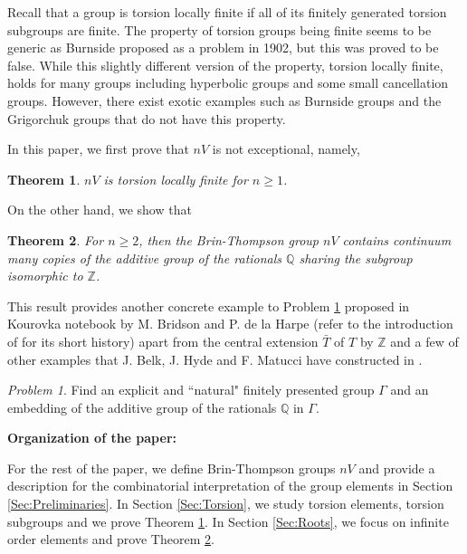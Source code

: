 \documentclass[12pt,reqno]{amsart}
\theoremstyle{plain}
\newtheorem{theorem}{Theorem}[section]
\theoremstyle{definition}
\theoremstyle{remark}
\newtheorem{problem}[remark]{Problem}
\numberwithin{equation}{section}
\begin{document}
Recall that a group is torsion locally finite if  
all of its finitely generated torsion subgroups are finite.  
%
The property of torsion groups being finite seems to be generic 
as Burnside proposed as a problem in 1902, 
but this was proved to be false. 
While this slightly different version of the property, torsion locally finite, 
holds for many groups including hyperbolic groups and 
some small cancellation groups.  
However, there exist exotic examples such as Burnside groups 
and the Grigorchuk groups  \cite{Grigorchuk}  
that do not have this property.

In this paper, 
we first prove that  $nV$  is not exceptional,
namely, 
 
\begin{theorem}\label{Thm:Main1} 
	$nV$  is torsion locally finite for  $n \geq 1$.  
\end{theorem} 

On the other hand,
we show that   %

\begin{theorem}\label{Thm:Main2} 
        For $n \geq 2$,  
	then the Brin-Thompson group  $nV$  contains continuum many copies of
	the additive group of the rationals  $\mathbb{Q}$  sharing 
	the subgroup isomorphic to  $\mathbb{Z}$.  
\end{theorem} 

This result provides another concrete example 
to Problem \ref{Prob:MainProblem} proposed in Kourovka notebook \cite{K} 
by M. Bridson and P. de la Harpe 
(refer to the introduction of  \cite{BHM} for its short history)
apart from the central extension  $\bar{T}$  of  $T$  by  $\mathbb{Z}$ 
and a few of other examples that J. Belk, J. Hyde and  F. Matucci have constructed in \cite{BHM}.
%	
\begin{problem}\label{Prob:MainProblem} 
	Find an explicit and ``natural" finitely presented group  $\Gamma$  
	and an embedding of the additive group of the rationals  $\mathbb{Q}$  in  
	$\Gamma$.  
\end{problem} 

\medskip  

\noindent
{\bf Organization of the paper:} 

For the rest of the paper, 
we define  
Brin-Thompson groups  $nV$  and 
provide a description for the combinatorial interpretation of the group elements 
in Section \ref{Sec:Preliminaries}. 
In Section \ref{Sec:Torsion}, 
we study torsion elements, 
torsion subgroups and we prove Theorem \ref{Thm:Main1}.
In Section \ref{Sec:Roots}, we focus on infinite order elements and prove Theorem \ref{Thm:Main2}. 
\medskip 
\end{document}
